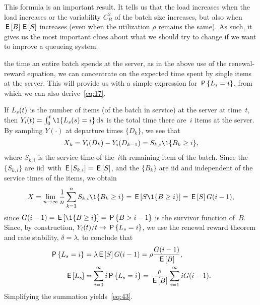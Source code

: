 \documentclass[stochastic-or.tex]{subfiles}
\begin{document}
This formula is an important result.
It tells us that the load increases when the load increases or the variability $C_{B}^{2}$ of the batch size increases, but also when $\,\mathsf{E}\left[B\right] \,\mathsf{E}\left[S\right]$ increases (even when the utilization $\rho$ remains the same). As such, it gives us the most important clues about  what we should try to change if we want to improve a queueing system.

 the time an entire batch spends at the server, as in the above use of the renewal-reward equation, we can
concentrate on the expected time spent by single items at the server.
This will provide us with a simple expression for $\,\mathsf{P}\left\{L_s=i\right\}$, from which we can also derive~\cref{eq:17}.

If $L_s(t)$ is the number of items (of the batch in service) at the server at time~$t$, then $Y_i(t) = \int_0^t \1{\Ls(s)=i} \d s$ is the total time there are~$i$ items at the server.
By sampling $Y(\cdot)$ at departure times $\{D_k\}$, we see that
\begin{align*}
X_k = Y_i(D_k) - Y_i(D_{k-1}) = S_{k,i} \1{B_{k} \geq i},
\end{align*}
where $S_{k,i}$ is the service time of the~$i$th remaining item of the batch.
Since the $\{S_{k, i}\}$ are iid\ with $\,\mathsf{E}\left[S_{k,i}\right] = \,\mathsf{E}\left[S\right]$, and the $\{B_k\}$ are iid and independent of the service times of the items, we obtain
 \begin{equation*}
X = \lim_{n\to\infty} \frac{1}{n}\sum_{k=1}^n S_{k,i} \1{B_{k} \geq i} = \E{S \1{B\geq i}} = \E S G(i-1),
 \end{equation*}
since $G(i-1) = \E{\1{B\geq i}} = \P{B> i-1}$ is the survivor function of~$B$.
Since, by construction, $Y_i(t)/t \to \,\mathsf{P}\left\{L_s=i\right\}$,   we use the renewal reward theorem and rate stability, $\delta = \lambda$, to conclude that
 \begin{align*}
 \,\mathsf{P}\left\{L_s = i\right\} &= \lambda \,\mathsf{E}\left[S\right] G(i-1) = \rho \frac{G(i-1)}{\,\mathsf{E}\left[B\right]}, \\
 \,\mathsf{E}\left[L_s\right] &= \sum_{i=0}^\infty i \,\mathsf{P}\left\{L_s=i\right\} = \frac{\rho}{\,\mathsf{E}\left[B\right]} \sum_{i=1}^\infty i G(i-1).
\end{align*}
Simplifying  the summation yields~\cref{eq:43}.
\end{document}
